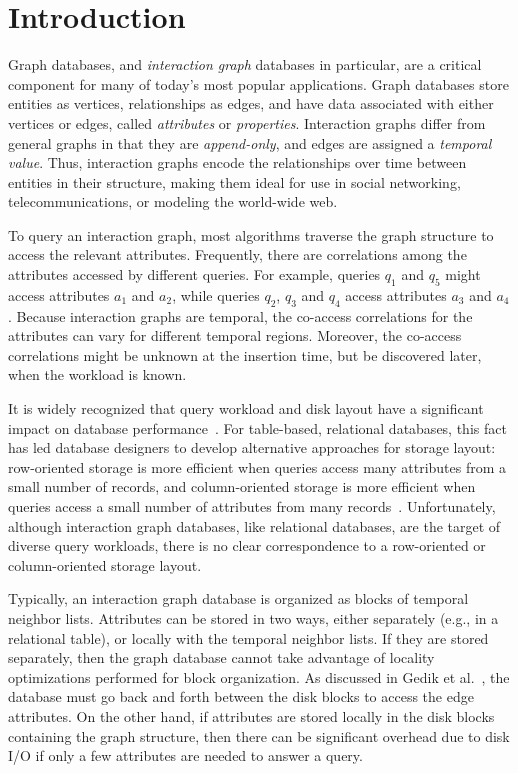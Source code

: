 \section{Introduction}\label{sec:introduction}

Graph databases, and \emph{interaction graph} databases in particular, are a
critical component for many of today's most popular applications.  Graph
databases store entities as vertices, relationships as edges, and have data
associated with either vertices or edges, called \emph{attributes} or
\emph{properties}.  Interaction graphs differ from general graphs in that they
are \emph{append-only}, and edges are assigned a \emph{temporal value}.  Thus,
interaction graphs encode the relationships over time between entities in
their structure, making them ideal for use in social networking,
telecommunications, or modeling the world-wide web.

To query an interaction graph, most algorithms traverse the graph structure to
access the relevant attributes.  Frequently, there are correlations among the
attributes accessed by different queries. For example, queries $q_1$ and $q_5$
might access attributes $a_1$ and $a_2$, while queries $q_2$, $q_3$ and $q_4$
access attributes $a_3$ and $a_4$. Because interaction graphs are temporal,
the co-access correlations for the attributes can vary for different temporal
regions.  Moreover, the co-access correlations might be unknown at the
insertion time, but be discovered later, when the workload is known.

It is widely recognized that query workload and disk layout have a significant
impact on database performance~\cite{alagiannis14,grund10,stonebraker05}.  For
table-based, relational databases, this fact has led database designers to
develop alternative approaches for storage layout: row-oriented storage is
more efficient when queries access many attributes from a small number of
records, and column-oriented storage is more efficient when queries access a
small number of attributes from many records~\cite{stonebraker05}. 
Unfortunately, although interaction graph databases, like relational
databases, are the target of diverse query workloads, there is no clear
correspondence to a row-oriented or column-oriented storage layout.

Typically, an interaction graph database is organized as blocks of temporal
neighbor lists.  Attributes can be stored in two ways, either separately
(e.g., in a relational table), or locally with the temporal neighbor lists. 
If they are stored separately, then the graph database cannot take advantage
of locality optimizations performed for block organization.  As discussed in
Gedik et al.~\cite{gedik14}, the database must go back and forth between the
disk blocks to access the edge attributes.  On the other hand, if attributes
are stored locally in the disk blocks containing the graph structure, then
there can be significant overhead due to disk I/O if only a few attributes are
needed to answer a query.

